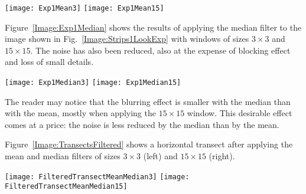 \begin{figure*}[hbt]
	\texttt{[image: Exp1Mean3]}
	\texttt{[image: Exp1Mean15]}
	\caption{Speckled strips filtered with the mean and windows of sizes $3\times3$ (left) and $15\times15$ (right)}\label{Image:Exp1Mean}
\end{figure*}

Figure~\ref{Image:Exp1Median} shows the results of applying the median filter to the image shown in Fig.~\ref{Image:Strips1LookExp} with windows of sizes $3\times3$ and $15\times15$.
The noise has also been reduced, also at the expense of blocking effect and loss of small details.

\begin{figure*}[hbt]
	\texttt{[image: Exp1Median3]}
	\texttt{[image: Exp1Median15]}
	\caption{Speckled strips filtered with the median and windows of sizes $3\times3$ (left) and $15\times15$ (right)}\label{Image:Exp1Median}
\end{figure*}

The reader may notice that the blurring effect is smaller with the median than with the mean, mostly when applying the $15\times15$ window.
This desirable effect comes at a price: the noise is less reduced by the median than by the mean.

Figure~\ref{Image:TransectsFiltered} shows a horizontal transect after applying the mean and median filters of sizes $3\times3$ (left) and $15\times15$ (right).

\begin{figure*}[hbt]
	\texttt{[image: FilteredTransectMeanMedian3]}
	\texttt{[image: FilteredTransectMeanMedian15]}
	\caption{Horizontal transect of the speckled strips filtered with the median and windows of sizes $3\times3$ (left) and $15\times15$ (right)}\label{Image:TransectsFiltered}
\end{figure*}